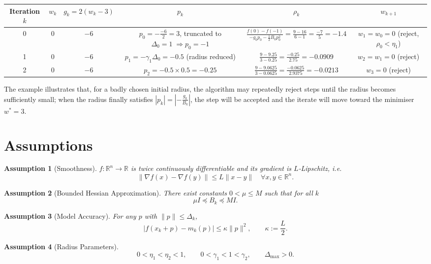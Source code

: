 \documentclass{article}
\newtheorem{assumption}{Assumption}
\begin{document}
\begin{center}
\begin{tabular}{c c c c c c}
\toprule
Iteration $k$ & $w_{k}$ & $g_{k}=2(w_{k}-3)$ & $p_{k}$ & $\rho_{k}$ & $w_{k+1}$\\
\midrule
0 & $0$ & $-6$ &
$\displaystyle p_{0}= -\frac{-6}{2}=3$, truncated to $\Delta_{0}=1\;\Rightarrow p_{0}=-1$ &
$\displaystyle
\frac{f(0)-f(-1)}{-g_{0}p_{0}-\tfrac12 B_{0}p_{0}^{2}}
=
\frac{9-16}{6-1}= \frac{-7}{5}= -1.4$ &
$w_{1}=w_{0}=0$ (reject, $\rho_{0}<\eta_{1}$)\\[4mm]
1 & $0$ & $-6$ &
$p_{1}=-\gamma_{1}\Delta_{0}=-0.5$ (radius reduced) &
$\displaystyle
\frac{9-9.25}{3-0.25}= \frac{-0.25}{2.75}= -0.0909$ &
$w_{2}=w_{1}=0$ (reject)\\[4mm]
2 & $0$ & $-6$ &
$p_{2}=-0.5\times0.5=-0.25$ &
$\displaystyle
\frac{9-9.0625}{3-0.0625}= \frac{-0.0625}{2.9375}= -0.0213$ &
$w_{3}=0$ (reject)\\
\bottomrule
\end{tabular}
\end{center}
The example illustrates that, for a badly chosen initial radius,
the algorithm may repeatedly reject steps until the radius becomes
sufficiently small; when the radius finally satisfies $|p_{k}|=|-\frac{g_{k}}{B_{k}}|$,
the step will be accepted and the iterate will move toward the minimiser $w^{*}=3$.

\section*{Assumptions}
\begin{assumption}[Smoothness]\label{ass:smooth}
$f:\mathbb{R}^{n}\to\mathbb{R}$ is twice continuously differentiable and its
gradient is $L$‑Lipschitz, i.e.
\[
\|\nabla f(x)-\nabla f(y)\|\le L\|x-y\|\quad\forall x,y\in\mathbb{R}^{n}.
\]
\end{assumption}
\begin{assumption}[Bounded Hessian Approximation]\label{ass:hessian}
There exist constants $0<\mu\le M$ such that for all $k$
\[
\mu I \preceq B_{k}\preceq M I .
\]
\end{assumption}
\begin{assumption}[Model Accuracy]\label{ass:model}
For any $p$ with $\|p\|\le\Delta_{k}$,
\[
|f(x_{k}+p)-m_{k}(p)|\le \kappa\|p\|^{2},
\qquad \kappa:=\frac{L}{2}.
\tag{6}
\]
\end{assumption}
\begin{assumption}[Radius Parameters]\label{ass:params}
\[
0<\eta_{1}<\eta_{2}<1,\qquad
0<\gamma_{1}<1<\gamma_{2},\qquad
\Delta_{\max}>0.
\]
\end{assumption}
\end{document}
